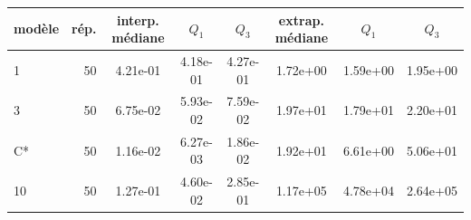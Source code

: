 \begin{tabular}{l r S[table-format=1.2e-2] S[table-format=1.2e-2] S[table-format=1.2e-2] S[table-format=1.2e-2] S[table-format=1.2e-2] S[table-format=1.2e-2]}
\toprule
{mod\`ele} & {r\'ep.} & {interp. m\'ediane} & {\(Q_1\)} & {\(Q_3\)} & {extrap. m\'ediane} & {\(Q_1\)} & {\(Q_3\)} \\
 & 50 & 4.21e-01 & 4.18e-01 & 4.27e-01 & 1.72e+00 & 1.59e+00 & 1.95e+00 \\
3 & 50 & 6.75e-02 & 5.93e-02 & 7.59e-02 & 1.97e+01 & 1.79e+01 & 2.20e+01 \\
C* & 50 & 1.16e-02 & 6.27e-03 & 1.86e-02 & 1.92e+01 & 6.61e+00 & 5.06e+01 \\
10 & 50 & 1.27e-01 & 4.60e-02 & 2.85e-01 & 1.17e+05 & 4.78e+04 & 2.64e+05 \\
\bottomrule
\end{tabular}
